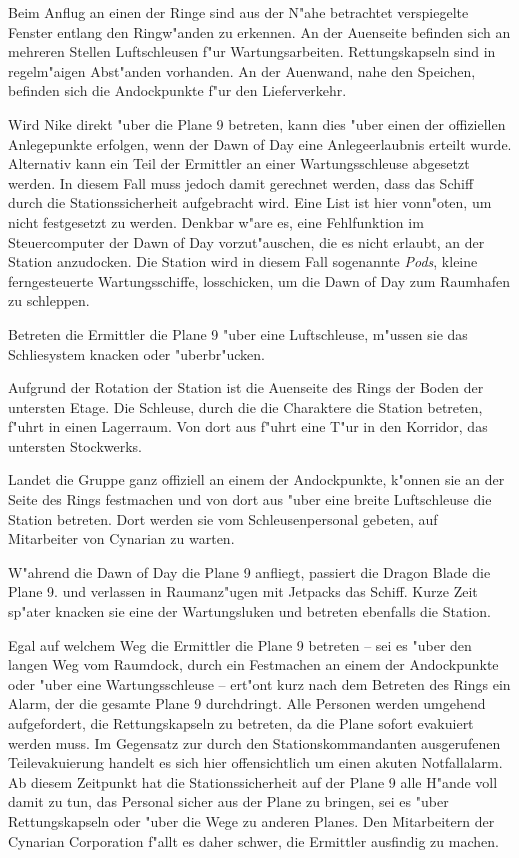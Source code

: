 Beim Anflug an einen der Ringe sind aus der N"ahe betrachtet verspiegelte Fenster entlang den Ringw"anden zu erkennen. An der Au\3enseite befinden sich an mehreren Stellen Luftschleusen f"ur Wartungsarbeiten. Rettungskapseln sind in regelm"a\3igen Abst"anden vorhanden. An der Au\3enwand, nahe den Speichen, befinden sich die Andockpunkte f"ur den Lieferverkehr.

Wird Nike direkt "uber die Plane 9 betreten, kann dies "uber einen der offiziellen Anlegepunkte erfolgen, wenn der Dawn of Day eine Anlegeerlaubnis erteilt wurde. Alternativ kann ein Teil der Ermittler an einer Wartungsschleuse abgesetzt werden. In diesem Fall muss jedoch damit gerechnet werden, dass das Schiff durch die Stationssicherheit aufgebracht wird. Eine List ist hier vonn"oten, um nicht festgesetzt zu werden. Denkbar w"are es, eine Fehlfunktion im Steuercomputer der Dawn of Day vorzut"auschen, die es nicht erlaubt, an der Station anzudocken. Die Station wird in diesem Fall sogenannte \emph{Pods}, kleine ferngesteuerte Wartungsschiffe, losschicken, um die Dawn of Day zum Raumhafen zu schleppen.

Betreten die Ermittler die Plane 9 "uber eine Luftschleuse, m"ussen sie das Schlie\3system knacken oder "uberbr"ucken.

Aufgrund der Rotation der Station ist die Au\3enseite des Rings der Boden der untersten Etage. Die Schleuse, durch die die Charaktere die Station betreten, f"uhrt in einen Lagerraum. Von dort aus f"uhrt eine T"ur in den Korridor, das untersten Stockwerks.

Landet die Gruppe ganz offiziell an einem der Andockpunkte, k"onnen sie an der Seite des Rings festmachen und von dort aus "uber eine breite Luftschleuse die Station betreten. Dort werden sie vom Schleusenpersonal gebeten, auf Mitarbeiter von Cynarian zu warten.

W"ahrend die Dawn of Day die Plane 9 anfliegt, passiert die Dragon Blade die Plane 9. \xl{} und \ml{} verlassen in Raumanz"ugen mit Jetpacks das Schiff. Kurze Zeit sp"ater knacken sie eine der Wartungsluken und betreten ebenfalls die Station.

Egal auf welchem Weg die Ermittler die Plane 9 betreten -- sei es "uber den langen Weg vom Raumdock, durch ein Festmachen an einem der Andockpunkte oder "uber eine Wartungsschleuse -- ert"ont kurz nach dem Betreten des Rings ein Alarm, der die gesamte Plane 9 durchdringt. Alle Personen werden umgehend aufgefordert, die Rettungskapseln zu betreten, da die Plane sofort evakuiert werden muss. Im Gegensatz zur durch den Stationskommandanten ausgerufenen Teilevakuierung handelt es sich hier offensichtlich um einen akuten Notfallalarm. Ab diesem Zeitpunkt hat die Stationssicherheit auf der Plane 9 alle H"ande voll damit zu tun, das Personal sicher aus der Plane zu bringen, sei es "uber Rettungskapseln oder "uber die Wege zu anderen Planes. Den Mitarbeitern der Cynarian Corporation f"allt es daher schwer, die Ermittler ausfindig zu machen.

